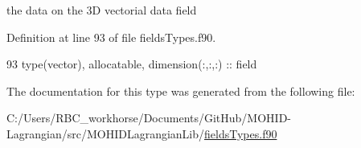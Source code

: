 the data on the 3D vectorial data field 



Definition at line 93 of file fields\+Types.\+f90.


\begin{DoxyCode}
93         \textcolor{keywordtype}{type}(vector), \textcolor{keywordtype}{allocatable}, \textcolor{keywordtype}{dimension(:,:,:)} :: field
\end{DoxyCode}


The documentation for this type was generated from the following file\+:\begin{DoxyCompactItemize}
\item 
C\+:/\+Users/\+R\+B\+C\+\_\+workhorse/\+Documents/\+Git\+Hub/\+M\+O\+H\+I\+D-\/\+Lagrangian/src/\+M\+O\+H\+I\+D\+Lagrangian\+Lib/\mbox{\hyperlink{fields_types_8f90}{fields\+Types.\+f90}}\end{DoxyCompactItemize}
